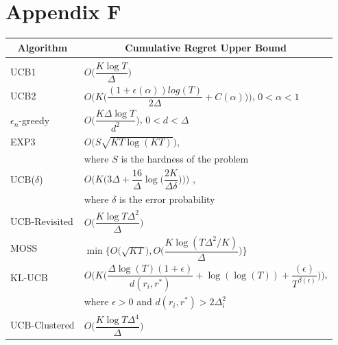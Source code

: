 \section*{Appendix F}
\label{sample-table}
\begin{center}
\begin{tabular}{ll}
\multicolumn{1}{c}{\bf Algorithm}  &\multicolumn{1}{c}{\bf Cumulative Regret Upper Bound} \\
\hline \\
UCB1         &$O\bigg(\dfrac{K\log T}{\Delta}\bigg)$ \\
UCB2         &$O\bigg(K\bigg(\dfrac{(1 + \epsilon(\alpha)) log(T)}{2\Delta} + C(\alpha)\bigg)\bigg)$, $0<\alpha<1$ \\
$\epsilon_{n}$-greedy         &$O\bigg(\dfrac{K\Delta\log T}{d^{2}}\bigg)$, $0<d<\Delta$ \\
EXP3             &$O\bigg(S \sqrt{KT \log(KT)}\bigg)$, \\& where $S$ is the hardness of the problem \\
UCB($\delta$)	&$O\bigg(K\bigg(3\Delta+\dfrac{16}{\Delta}\log\big(\dfrac{2K}{\Delta\delta}\big)\bigg)\bigg)$ ,\\& where $\delta$ is the error probability\\
UCB-Revisited             &$O\bigg(\dfrac{K\log T\Delta^{2}}{\Delta}\bigg)$ \\
MOSS	&$\min\bigg\lbrace O\bigg(\sqrt{KT}\bigg), O\bigg(\dfrac{K\log(T\Delta^{2}/K)}{\Delta}\bigg) \bigg \rbrace$\\
KL-UCB         &$O\bigg(K\bigg(\dfrac{\Delta \log(T)(1 + \epsilon)}{d(r_{i}, r^{*} )} + \log(\log(T)) + \dfrac{(\epsilon)}{T^{\beta(\epsilon)}}\bigg)\bigg)$,\\& where $\epsilon > 0$ and $d(r_{i}, r^{*})>2\Delta_{i}^{2}$\\
UCB-Clustered             &$O\bigg(\dfrac{K\log T\Delta^{4}}{\Delta}\bigg)$ \\
\end{tabular}
\end{center}


